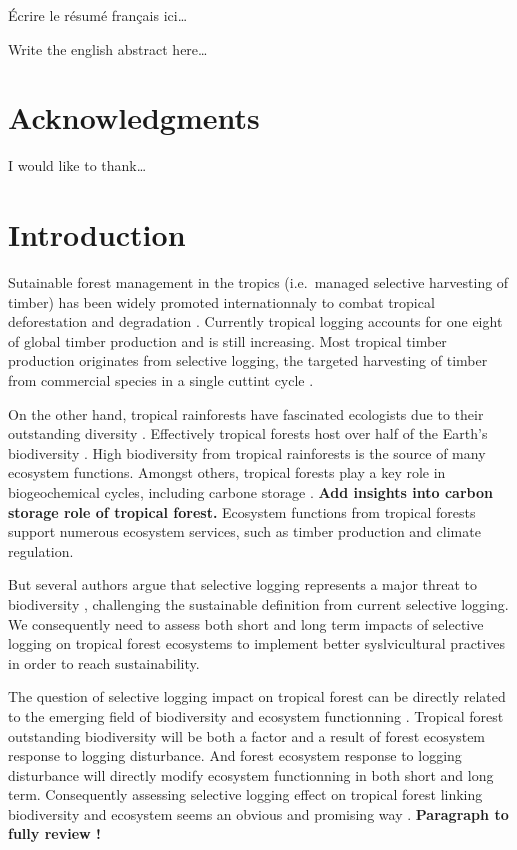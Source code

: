 \documentclass[]{article}
\let\oldsection\section
\renewcommand\section{\newpage\oldsection}
\theoremstyle{definition}
\theoremstyle{definition}
\theoremstyle{remark}
\begin{document}
Écrire le résumé français ici\ldots{}

Write the english abstract here\ldots{}

\section*{Acknowledgments}\label{acknowledgments}

I would like to thank\ldots{}

\section*{Introduction}\label{introduction}

Sutainable forest management in the tropics (i.e.~managed selective
harvesting of timber) has been widely promoted internationnaly to combat
tropical deforestation and degradation \citep{Zimmerman2012}. Currently
tropical logging accounts for one eight of global timber production
\citep{Blaser2011} and is still increasing. Most tropical timber
production originates from selective logging, the targeted harvesting of
timber from commercial species in a single cuttint cycle
\citep{Martin2015}.

On the other hand, tropical rainforests have fascinated ecologists due
to their outstanding diversity \citep{connell_diversity_1978}.
Effectively tropical forests host over half of the Earth's biodiversity
\citep{Scheffers2012}. High biodiversity from tropical rainforests is
the source of many ecosystem functions. Amongst others, tropical forests
play a key role in biogeochemical cycles, including carbone storage
\citep{Lewis2004}. \textbf{Add insights into carbon storage role of
tropical forest.} Ecosystem functions from tropical forests support
numerous ecosystem services, such as timber production and climate
regulation.

But several authors argue that selective logging represents a major
threat to biodiversity
\citep{Carreno-Rocabado2012, DeAvila2015, Gibson2013, Martin2015, Zimmerman2012},
challenging the sustainable definition from current selective logging.
We consequently need to assess both short and long term impacts of
selective logging on tropical forest ecosystems to implement better
syslvicultural practives in order to reach sustainability.

The question of selective logging impact on tropical forest can be
directly related to the emerging field of biodiversity and ecosystem
functionning \citep{Loreau2000}. Tropical forest outstanding
biodiversity will be both a factor and a result of forest ecosystem
response to logging disturbance. And forest ecosystem response to
logging disturbance will directly modify ecosystem functionning in both
short and long term. Consequently assessing selective logging effect on
tropical forest linking biodiversity and ecosystem seems an obvious and
promising way \citep{Loreau2010}. \textbf{Paragraph to fully review !}
\end{document}
